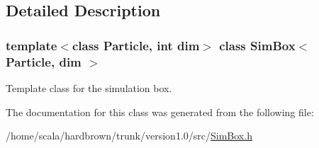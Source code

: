 \subsection{Detailed Description}
\subsubsection*{template$<$class Particle, int dim$>$ class SimBox$<$ Particle, dim $>$}

Template class for the simulation box. 

The documentation for this class was generated from the following file:\begin{CompactItemize}
\item 
/home/scala/hardbrown/trunk/version1.0/src/\hyperlink{SimBox_8h}{SimBox.h}\end{CompactItemize}
